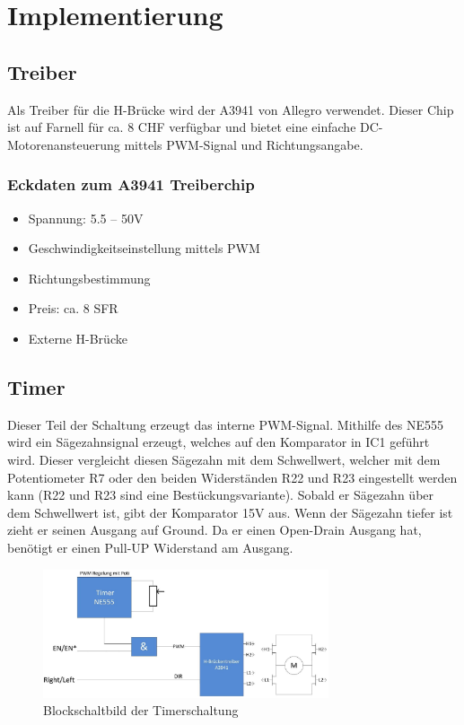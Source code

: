 \newpage
\section{Implementierung}

\subsection{Treiber}
Als Treiber für die H-Brücke wird der A3941 von Allegro verwendet. Dieser
Chip ist auf Farnell für ca. 8 CHF verfügbar und bietet eine einfache
DC-Motorenansteuerung mittels PWM-Signal und Richtungsangabe.

\subsubsection*{Eckdaten zum A3941 Treiberchip}
\begin{itemize}
	\item Spannung: 5.5 – 50V
	\item Geschwindigkeitseinstellung mittels PWM
	\item Richtungsbestimmung
	\item Preis: ca. 8 SFR
	\item Externe H-Brücke
\end{itemize}

\subsection{Timer}
Dieser Teil der Schaltung erzeugt das interne PWM-Signal. Mithilfe des
NE555 wird ein Sägezahnsignal erzeugt, welches auf den Komparator in IC1
geführt wird. Dieser vergleicht diesen Sägezahn mit dem Schwellwert,
welcher mit dem Potentiometer R7 oder den beiden Widerständen R22 und R23
eingestellt werden kann (R22 und R23 sind eine Bestückungsvariante). 
Sobald er Sägezahn über dem Schwellwert ist, gibt der Komparator 15V aus.
Wenn der Sägezahn tiefer ist zieht er seinen Ausgang auf Ground. Da er
einen Open-Drain Ausgang hat, benötigt er einen Pull-UP Widerstand am
Ausgang.

\begin{figure}[h!]
	\centering
	\includegraphics[width=0.75\textwidth]{src/dc/fig/timer_block.png}
	\caption{Blockschaltbild der Timerschaltung}
\end{figure}

